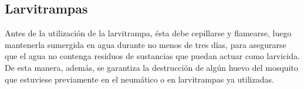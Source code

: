 \subsection{Larvitrampas}
\label{sec:densidad-vectorial-larvitrampas}
Antes de la utilización de la larvitrampa, ésta debe cepillarse y flamearse,
luego mantenerla sumergida en agua durante no menos de tres días, para
asegurarse que el agua no contenga residuos de sustancias que puedan actuar
como larvicida. De esta manera, además, se garantiza la destrucción de
algún huevo del mosquito que estuviese previamente en el neumático o en
larvitrampas ya utilizadas.
